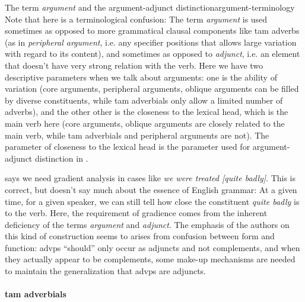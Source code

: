 \documentclass[UTF8, a4paper, oneside, scheme=plain, 12pt]{ctexbook}
\newcommand*{\citepage}[1]{p.~{#1}}
\newcommand*{\term}[1]{\emph{#1}}
\newcommand{\form}[1]{\emph{#1}}
\begin{document}
\begin{infobox}{The term \term{argument} and the argument-adjunct distinction}{argument-terminology}
    Note that here is a terminological confusion:
    The term \term{argument} is used sometimes 
    as opposed to more grammatical clausal components like \acs{tam} adverbs
    (as in \term{peripheral argument}, 
    i.e. any specifier positions that allows large variation with regard to its content),
    and sometimes as opposed to \term{adjunct},
    i.e. an element that doesn't have very strong relation with the verb.
    Here we have two descriptive parameters when we talk about arguments:
    one is the ability of variation
    (core arguments, peripheral arguments, oblique arguments can be filled by diverse constituents,
    while \acs{tam} adverbials only allow a limited number of adverbs),
    and the other other is the closeness to the lexical head, which is the main verb here 
    (core arguments, oblique arguments are closely related to the main verb,
    while \acs{tam} adverbials and peripheral arguments are not).
    The parameter of closeness to the lexical head is the parameter used for argument-adjunct distinction
    in .

    \citet[\citepage{732}]{quirk1985} says we need gradient analysis 
    in cases like \form{we were treated [quite badly]}.
    This is correct, but doesn't say much about the essence of English grammar:
    At a given time, for a given speaker,
    we can still tell how close the constituent \form{quite badly} is to the verb.
    Here, the requirement of gradience 
    comes from the inherent deficiency of the terms \term{argument} and \term{adjunct}. 
    The emphasis of the authors on this kind of construction 
    seems to arises from confusion between form and function:
    \acs{advp}s ``should'' only occur as adjuncts and not complements,
    and when they actually appear to be complements,
    some make-up mechanisms are needed to maintain the generalization that \acs{advp}s are adjuncts.
\end{infobox}

\paragraph*{\ac{tam} adverbials}
\end{document}
